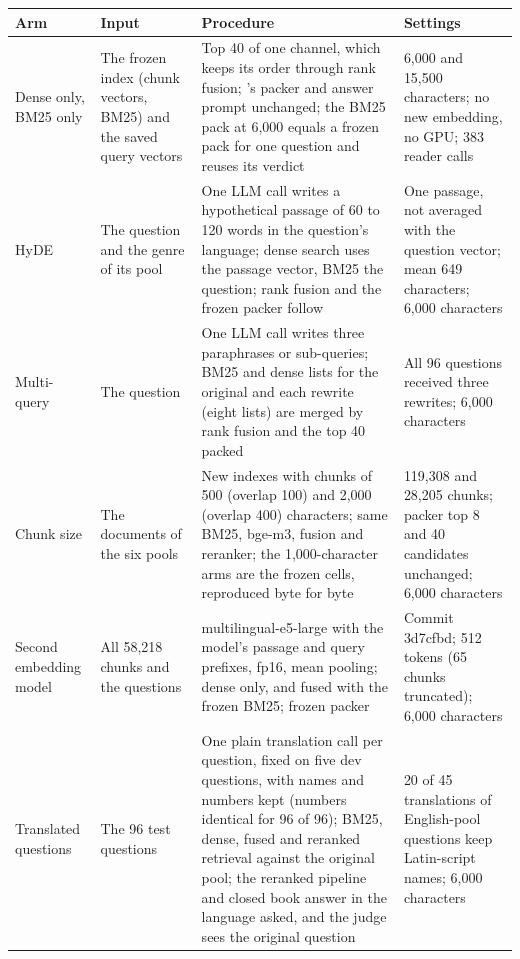 \begin{table}[t]
\centering
\scriptsize
\setlength{\tabcolsep}{4pt}
\begin{tabularx}{\textwidth}{@{}p{2.6cm}p{2.9cm}Xp{2.8cm}@{}}
\toprule
Arm & Input & Procedure & Settings \\
\midrule
Dense only, BM25 only & The frozen \hybrid{} index (chunk vectors, BM25) and the saved query vectors & Top 40 of one channel, which keeps its order through rank fusion; \hybrid{}'s packer and answer prompt unchanged; the BM25 pack at 6,000 equals a frozen pack for one question and reuses its verdict & 6,000 and 15,500 characters; no new embedding, no GPU; 383 reader calls \\
HyDE & The question and the genre of its pool & One LLM call writes a hypothetical passage of 60 to 120 words in the question's language; dense search uses the passage vector, BM25 the question; rank fusion and the frozen packer follow & One passage, not averaged with the question vector; mean 649 characters; 6,000 characters \\
Multi-query & The question & One LLM call writes three paraphrases or sub-queries; BM25 and dense lists for the original and each rewrite (eight lists) are merged by rank fusion and the top 40 packed & All 96 questions received three rewrites; 6,000 characters \\
Chunk size & The documents of the six pools & New indexes with chunks of 500 (overlap 100) and 2,000 (overlap 400) characters; same BM25, bge-m3, fusion and reranker; the 1,000-character arms are the frozen cells, reproduced byte for byte & 119,308 and 28,205 chunks; packer top 8 and 40 candidates unchanged; 6,000 characters \\
Second embedding model & All 58,218 chunks and the questions & multilingual-e5-large with the model's passage and query prefixes, fp16, mean pooling; dense only, and fused with the frozen BM25; frozen packer & Commit 3d7cfbd; 512 tokens (65 chunks truncated); 6,000 characters \\
Translated questions & The 96 test questions & One plain translation call per question, fixed on five dev questions, with names and numbers kept (numbers identical for 96 of 96); BM25, dense, fused and reranked retrieval against the original pool; the reranked pipeline and closed book answer in the language asked, and the judge sees the original question & 20 of 45 translations of English-pool questions keep Latin-script names; 6,000 characters \\

\end{tabularx}
\end{table}

